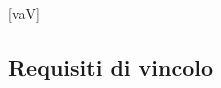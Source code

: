 
	[vaV]

	\newcommand{\ReqV}[3]{\stepcounter{vaV}R\thevaV V#1 & #2 & #3 \\}
	\newcommand{\subReqV}[3]{\stepcounter{secV}R\thevaV.\thesecV V#1 & #2 & #3 \\}

	
	
	
	

	\subsection{Requisiti di vincolo}\label{RequisitiVincolo}

